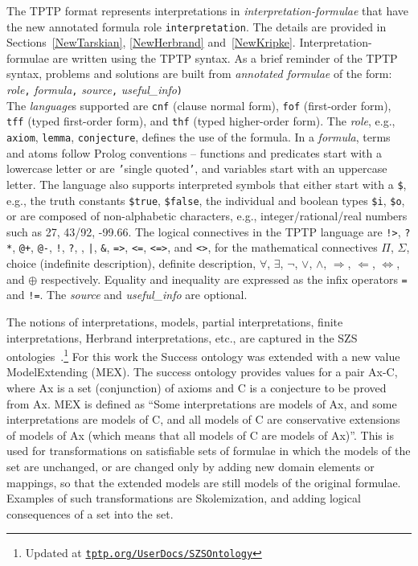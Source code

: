 \documentclass{easychair}
\newcommand{\smalltt}[1]{\small \texttt{#1}}
\newcommand{\tildenot}{\raisebox{0.4ex}{\texttildelow}}
\begin{document}
The TPTP format represents interpretations in \emph{interpretation-formulae} that have the new
annotated formula role \smalltt{interpretation}.
The details are provided in Sections~\ref{NewTarskian}, \ref{NewHerbrand} and~\ref{NewKripke}.
Interpretation-formulae are written using the TPTP syntax.
As a brief reminder of the TPTP syntax, problems and solutions are built from 
{\em annotated formulae} of the form: \\
{\em role}{\tt ,}
{\em formula}{\tt ,}
{\em source}{\tt ,}
{\em useful\_info}{\tt )} \\
The {\em language}s supported are \smalltt{cnf} (clause normal form), \smalltt{fof}
(first-order form), \smalltt{tff} (typed first-order form), and \smalltt{thf}
(typed higher-order form).
The {\em role}, e.g., \smalltt{axiom}, \smalltt{lemma}, \smalltt{conjecture}, defines the 
use of the formula.
In a {\em formula}, terms and atoms follow Prolog conventions -- functions and predicates start 
with a lowercase letter or are {\tt '}single quoted{\tt '}, and variables start with an uppercase 
letter.
The language also supports interpreted symbols that either start with a {\tt \$}, e.g., the 
truth constants \smalltt{\$true}, \smalltt{\$false}, the individual and boolean
types \smalltt{\$i}, \smalltt{\$o}, or are composed of 
non-alphabetic characters, e.g., integer/rational/real numbers such as 27, 43/92, -99.66.
The logical connectives in the TPTP language are
{\tt !>}, {\tt ?*}, {\tt @+}, {\tt @-}, {\tt !}, {\tt ?}, {\tt {\tildenot}}, {\tt |}, {\tt \&}, 
{\tt =>}, {\tt <=}, {\tt <=>}, and {\tt <{\tildenot}>}, for the mathematical connectives
$\Pi$, $\Sigma$, choice (indefinite description), definite description,
$\forall$, $\exists$, $\neg$, $\vee$, $\wedge$, $\Rightarrow$, $\Leftarrow$, $\Leftrightarrow$, 
and $\oplus$ respectively.
Equality and inequality are expressed as the infix operators {\tt =} and {\tt !=}.
The {\em source} and {\em useful\_info} are optional.

The notions of interpretations, models, partial interpretations, finite interpretations,
Herbrand interpretations, etc., are captured in the SZS 
ontologies~\cite{Sut08-KEAPPA}.\footnote{%
Updated at
\href{https://tptp.org/UserDocs/SZSOntology/}{\tt tptp.org/UserDocs/SZSOntology}}
For this work the Success ontology was extended with a new value ModelExtending (MEX).
The success ontology provides values for a pair Ax-C, where Ax is a set (conjunction) of axioms 
and C is a conjecture to be proved from Ax. 
MEX is defined as ``Some interpretations are models of Ax, and some interpretations are models 
of C, and all models of C are conservative extensions of models of Ax (which means that all 
models of C are models of Ax)''.
This is used for transformations on satisfiable sets of formulae in which the models of the set 
are unchanged, or are changed only by adding new domain elements or mappings, so that the
extended models are still models of the original formulae. 
Examples of such transformations are Skolemization, and adding logical consequences of a set 
into the set.
\end{document}
